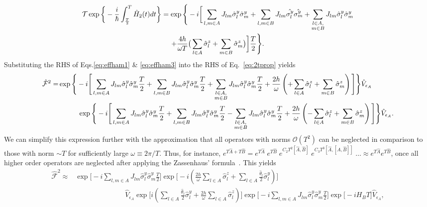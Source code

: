 \documentclass[
nofootinbib,
reprint,
superscriptaddress,
amsmath,amssymb,showkeys,
aps,
prb,
]{revtex4-2}
\begin{document}
	\begin{multline}
		\mathcal{T}\exp\bigg\{-\frac{i}{\hbar}\int_{\frac{T}{2}}^{T} \hat{H}_2(t) dt\bigg\} = \exp\Bigg\{-i \bigg[ \sum_{l,m\in A}J_{lm} \hat{\sigma}_l^y\hat{\sigma}_m^y +\sum_{l,m\in B}J_{lm}
		\hat{\sigma_l^y}\hat{\sigma_m^y}+\sum_{\substack{%
				l \in A,\\
				m \in B\hfill}} J_{lm}\hat{\sigma}^y_l\hat{\sigma}^y_m\\
		+\frac{4h}{\omega T}\big( \sum_{l\in A}^{}\hat{\sigma}^z_l + \sum_{m\in B}^{}\hat{\sigma}^z_m\big)\bigg]\frac{T}{2}\Bigg\}.
		\label{eq:effham3}
	\end{multline}	
	Substituting the RHS of Eqs.\eqref{eq:effham1} \& \eqref{eq:effham3} into the RHS of Eq.~\eqref{eq:2tprop} yields    	
	\begin{align}
		\hat{\mathcal{F}}^2 
		=& \exp\Bigg\{-i \Bigg[ \sum_{l,m\in A}J_{lm} \hat{\sigma}^y_l\hat{\sigma}^y_m\frac{T}{2} +\sum_{l,m\in B}J_{lm} \hat{\sigma}^y_l\hat{\sigma}^y_m\frac{T}{2}+\sum_{\substack{%
				l \in A,\\
				m \in B\hfill}} J_{lm}\hat{\sigma}^y_l\hat{\sigma}^y_m\frac{T}{2} +\frac{2h}{\omega }\left( +\sum_{l\in A}^{}\hat{\sigma}^z_l + \sum_{m\in B}^{}\hat{\sigma}^z_m\right)\Bigg]\Bigg\} \hat{V}_{\epsilon_A} \nonumber\\
		& \hspace{1 cm}\exp\Bigg\{-i \Bigg[ \sum_{l,m\in A}J_{lm} \hat{\sigma}^y_l\hat{\sigma}^y_m\frac{T}{2} +\sum_{l,m\in B}J_{lm} \hat{\sigma}^y_l\hat{\sigma}^y_m\frac{T}{2}-\sum_{\substack{%
				l \in A,\\
				m \in B\hfill}} J_{lm}\hat{\sigma}^y_l\hat{\sigma}^y_m\frac{T}{2} +\frac{2h}{\omega}\left( -\sum_{l\in A}^{}\hat{\sigma}^z_l + \sum_{m\in B}^{}\hat{\sigma}^z_m\right)\Bigg]\Bigg\} \hat{V}_{\epsilon_A}.\nonumber
	\end{align}
	We can simplify this expression further with the approximation that all operators with norms $\mathcal{O}(T^2)$ can be neglected in comparison to those with norm $\sim T$ for sufficiently large $\omega\equiv 2\pi/T$. Thus, for instance, $e^{T\hat{A} + T\hat{B}}= e^{T\hat{A}}\; e^{T\hat{B}}\;e^{C_2 T^2\left[\hat{A}, \hat{B}\right]}\;e^{C_3 T^3\left[\hat{A},\left[\hat{A}, \hat{B}\right]\right]}\;\dots \approx e^{T\hat{A}} e^{T\hat{B}}$, once all higher order operators are neglected after applying the Zassenhaus' formula~\cite{Magnus1954}. This yields
	\begin{align}	
		\hat{\mathcal{F}}^2 	\approx& \exp\Bigg[-i \sum_{l,m\in A}J_{lm} \hat{\sigma}^y_l\hat{\sigma}^y_m\frac{T}{2}\Bigg] \exp\Bigg[-i\left(\frac{2h}{\omega } \sum_{l\in A}^{}\hat{\sigma}^z_l + \sum_{l \in A}\frac{\hat{\theta}_{l}}{2}\hat{\sigma}^y_l\right)\Bigg]\nonumber\\ 
		&\hspace{3cm} \hat{V}_{\epsilon_A} \exp\Bigg[i \left(\sum_{l \in A}\frac{\hat{\theta}_{l}}{2}\hat{\sigma}^y_l + \frac{2h}{\omega} \sum_{l\in A}^{}\hat{\sigma}^z_l\right)\Bigg] \exp\Bigg[-i\sum_{l,m\in A}J_{lm} \hat{\sigma}^y_l\hat{\sigma}^y_m\frac{T}{2}\Bigg] \exp\big[-i H_B T\big]\hat{V}_{\epsilon_A},\nonumber
	\end{align}
\end{document}
